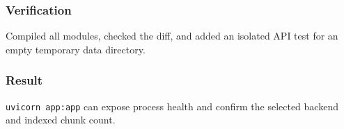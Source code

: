 \subsubsection{Verification}

Compiled all modules, checked the diff, and added an isolated API test for an empty temporary data directory.

\subsubsection{Result}

\texttt{uvicorn\ app:app} can expose process health and confirm the selected backend and indexed chunk count.


